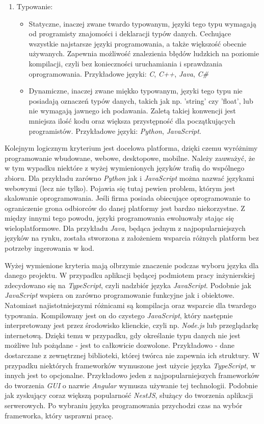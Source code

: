 \documentclass[skorowidz,skroty]{dyplomWEZUT}
\begin{document}
\begin{enumerate}
\item Typowanie:
\begin{itemize}
	\item Statyczne, inaczej zwane twardo typowanym, języki tego typu wymagają od programisty znajomości i deklaracji typów danych. Cechujące wszystkie najstarsze języki programowania, a także większość obecnie używanych. Zapewnia możliwość znalezienia błędów ludzkich na poziomie kompilacji, czyli bez konieczności uruchamiania i sprawdzania oprogramowania. Przykładowe języki: \textit{C}, \textit{C++}, \textit{Java}, \textit{C\#}
	 \item Dynamiczne, inaczej zwane miękko typowanym, języki tego typu nie posiadają oznaczeń typów danych, takich jak np. 'string' czy 'float', lub nie wymagają jawnego ich podawania. Zaletą takiej konwencji jest mniejsza ilość kodu oraz większa przystępność dla początkujących programistów. Przykładowe języki: \textit{Python}, \textit{JavaScript}. 

\end{itemize}

\end{enumerate} 
Kolejnym logicznym kryterium jest docelowa platforma, dzięki czemu wyróżnimy programowanie wbudowane, webowe, desktopowe, mobilne. Należy zauważyć, że w tym wypadku niektóre z wyżej wymienionych języków trafią do wspólnego zbioru. Dla przykładu zarówno \textit{Python} jak i \textit{JavaScript} można nazwać językami webowymi (lecz nie tylko). Pojawia się tutaj pewien problem, którym jest skalowanie oprogramowania. Jeśli firma posiada obiecujące oprogramowanie to ograniczenie grona odbiorców do danej platformy jest bardzo niekorzystne. Z między innymi tego powodu, języki programowania ewoluowały stając się wieloplatformowe. Dla przykładu \textit{Java}, będąca jednym z najpopularniejszych języków na rynku, została stworzona z założeniem wsparcia różnych platform bez potrzeby ingerowania w kod. 

Wyżej wymienione kryteria mają olbrzymie znaczenie podczas wyboru języka dla danego projektu. W przypadku aplikacji będącej podmiotem pracy inżynierskiej zdecydowano się na \textit{TypeScript}, czyli nadzbiór języka \textit{JavaScript}. Podobnie jak \textit{JavaScript} wspiera on zarówno programowanie funkcyjne jak i obiektowe. Natomiast najistotniejszymi różnicami są kompilacja oraz wsparcie dla twardego typowania. Kompilowany jest on do czystego \textit{JavaScript}, który następnie interpretowany jest przez środowisko klienckie, czyli np. \textit{Node.js} lub przeglądarkę internetową. Dzięki temu w przypadku, gdy określanie typu danych nie jest możliwe lub pożądane - jest to całkowicie dozwolone. Przykładowo - dane dostarczane z zewnętrznej biblioteki, której twórca nie zapewnia ich struktury. W przypadku niektórych frameworków wymuszone jest użycie języka \textit{TypeScript}, w innych jest to opcjonalne. Przykładowo jeden z najpopularniejszych frameworków do tworzenia \textit{GUI} o nazwie \textit{Angular} wymusza używanie tej technologii. Podobnie jak zyskujący coraz większą popularność \textit{NestJS}, służący do tworzenia aplikacji serwerowych. Po wybraniu języka programowania przychodzi czas na wybór frameworka, który usprawni pracę.
\end{document}
